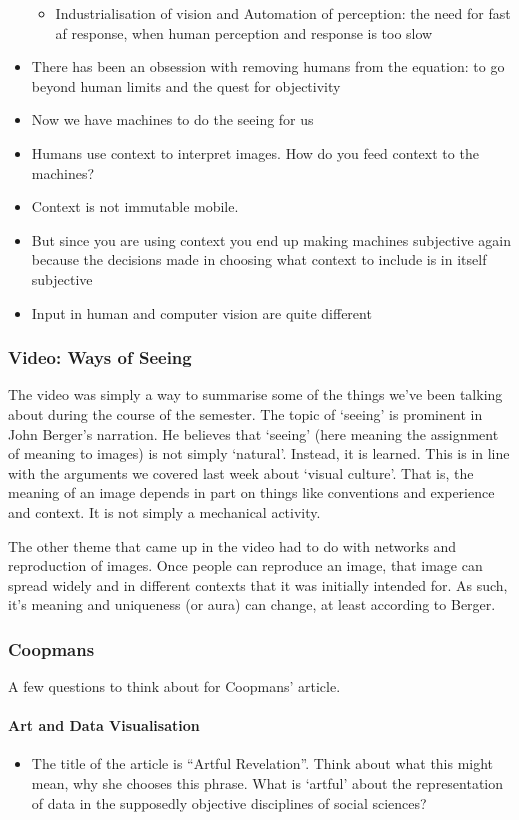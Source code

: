 \documentclass[a4paper]{article}
\begin{document}
\begin{itemize}
\begin{itemize}[label=$\circ$]
		\item Industrialisation of vision and Automation of perception: the need for fast af response, when human perception and response is too slow
	\end{itemize}
	\item There has been an obsession with removing humans from the equation: to go beyond human limits and the quest for objectivity
	\item Now we have machines to do the seeing for us
	\item Humans use context to interpret images. How do you feed context to the machines?
	\item Context is not immutable mobile. 
	\item But since you are using context you end up making machines subjective again because the decisions made in choosing what context to include is in itself subjective
	\item Input in human and computer vision are quite different
\end{itemize}

\subsubsection{Video: Ways of Seeing}
The video was simply a way to summarise some of the things we've been talking about during the course of the semester. The topic of `seeing' is prominent in John Berger's narration. He believes that `seeing' (here meaning the assignment of meaning to images) is not simply `natural'. Instead, it is learned. This is in line with the arguments we covered last week about `visual culture'. That is, the meaning of an image depends in part on things like conventions and experience and context. It is not simply a mechanical activity.

\medskip
\noindent The other theme that came up in the video had to do with networks and reproduction of images. Once people can reproduce an image, that image can spread widely and in different contexts that it was initially intended for. As such, it's meaning and uniqueness (or aura) can change, at least according to Berger.

\subsubsection{Coopmans}
A few questions to think about for Coopmans’ article.

\paragraph{Art and Data Visualisation}
\begin{itemize}
	\item The title of the article is ``Artful Revelation''. Think about what this might mean, why she chooses this phrase. What is `artful' about the representation of data in the supposedly objective disciplines of social sciences?
\end{itemize}
\end{document}
